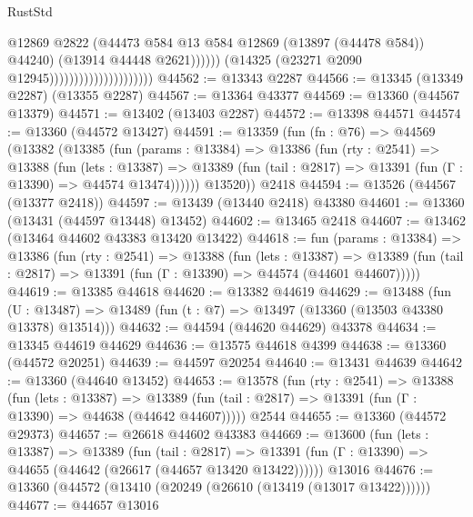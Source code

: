 \begin{lexlean}{RustStd}
\begin{coremodule}
                                                    @12869
                                                    @2822
                                                    (@44473
                                                      @584
                                                      @13
                                                      @584
                                                      @12869
                                                      (@13897 (@44478 @584))
                                                      @44240)
                                                    (@13914 @44448 @2621))))))
                                          (@14325 (@23271 @2090 @12945)))))))))))))))))))))
@44562 := @13343 @2287
@44566 := @13345 (@13349 @2287) (@13355 @2287)
@44567 := @13364 @43377
@44569 := @13360 (@44567 @13379)
@44571 := @13402 (@13403 @2287)
@44572 := @13398 @44571
@44574 := @13360 (@44572 @13427)
@44591 := @13359
    (fun (fn : @76) =>
    @44569
      (@13382
        (@13385
          (fun (params : @13384) =>
          @13386
            (fun (rty : @2541) =>
            @13388
              (fun (lets : @13387) =>
              @13389 (fun (tail : @2817) => @13391 (fun (Γ : @13390) => @44574 @13474))))))
        @13520))
    @2418
@44594 := @13526 (@44567 (@13377 @2418))
@44597 := @13439 (@13440 @2418) @43380
@44601 := @13360 (@13431 (@44597 @13448) @13452)
@44602 := @13465 @2418
@44607 := @13462 (@13464 @44602 @43383 @13420 @13422)
@44618 := fun (params : @13384) =>
  @13386
    (fun (rty : @2541) =>
    @13388
      (fun (lets : @13387) =>
      @13389 (fun (tail : @2817) => @13391 (fun (Γ : @13390) => @44574 (@44601 @44607)))))
@44619 := @13385 @44618
@44620 := @13382 @44619
@44629 := @13488
    (fun (U : @13487) => @13489 (fun (t : @7) => @13497 (@13360 (@13503 @43380 @13378) @13514)))
@44632 := @44594 (@44620 @44629) @43378
@44634 := @13345 @44619 @44629
@44636 := @13575 @44618 @4399
@44638 := @13360 (@44572 @20251)
@44639 := @44597 @20254
@44640 := @13431 @44639
@44642 := @13360 (@44640 @13452)
@44653 := @13578
    (fun (rty : @2541) =>
    @13388
      (fun (lets : @13387) =>
      @13389 (fun (tail : @2817) => @13391 (fun (Γ : @13390) => @44638 (@44642 @44607)))))
    @2544
@44655 := @13360 (@44572 @29373)
@44657 := @26618 @44602 @43383
@44669 := @13600
    (fun (lets : @13387) =>
    @13389
      (fun (tail : @2817) =>
      @13391 (fun (Γ : @13390) => @44655 (@44642 (@26617 (@44657 @13420 @13422))))))
    @13016
@44676 := @13360 (@44572 (@13410 (@20249 (@26610 (@13419 (@13017 @13422))))))
@44677 := @44657 @13016

\end{coremodule}
\end{lexlean}
